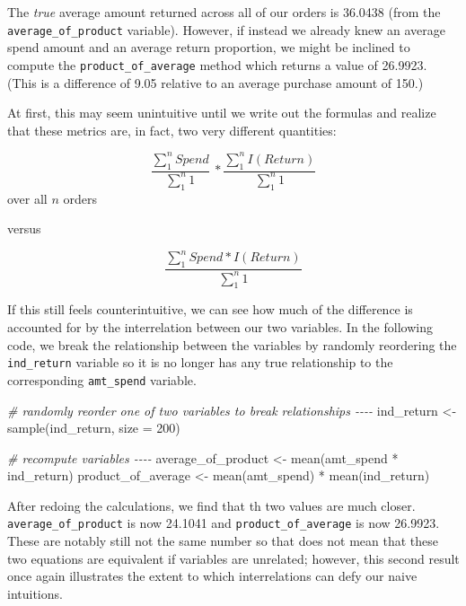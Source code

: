 \documentclass[
]{krantz}
\makeatletter
\newenvironment{Shaded}{\begin{snugshade}}{\end{snugshade}}
\newcommand{\AttributeTok}[1]{\textcolor[rgb]{0.61,0.61,0.61}{#1}}
\newcommand{\CommentTok}[1]{\textcolor[rgb]{0.37,0.37,0.37}{\textit{#1}}}
\newcommand{\DecValTok}[1]{\textcolor[rgb]{0.06,0.06,0.06}{#1}}
\newcommand{\FunctionTok}[1]{\textcolor[rgb]{0,0,0}{#1}}
\newcommand{\NormalTok}[1]{#1}
\newcommand{\OtherTok}[1]{\textcolor[rgb]{0.37,0.37,0.37}{#1}}
\newcommand{\SpecialCharTok}[1]{\textcolor[rgb]{0,0,0}{#1}}
\newenvironment{kframe}{%
\medskip{}
\setlength{\fboxsep}{.8em}
 \def\at@end@of@kframe{}%
 \ifinner\ifhmode%
  \def\at@end@of@kframe{\end{minipage}}%
  \begin{minipage}{\columnwidth}%
 \fi\fi%
 \def\FrameCommand##1{\hskip\@totalleftmargin \hskip-\fboxsep
 \colorbox{shadecolor}{##1}\hskip-\fboxsep
     \hskip-\linewidth \hskip-\@totalleftmargin \hskip\columnwidth}%
 \MakeFramed {\advance\hsize-\width
   \@totalleftmargin\z@ \linewidth\hsize
   \@setminipage}}%
 {\par\unskip\endMakeFramed%
 \at@end@of@kframe}
\renewenvironment{Shaded}{\begin{kframe}}{\end{kframe}}
\makeatother
\begin{document}
The \emph{true} average amount returned across all of our orders is 36.0438 (from the \texttt{average\_of\_product} variable).
However, if instead we already knew an average spend amount and an average return proportion, we might be inclined to compute the \texttt{product\_of\_average} method which returns a value of 26.9923.
(This is a difference of 9.05 relative to an average purchase amount of 150.)

At first, this may seem unintuitive until we write out the formulas and realize that these metrics are, in fact, two very different quantities:

\[ \frac{ \sum_{1}^{n} Spend }{\sum_{1}^{n} 1} \ * \frac{ \sum_{1}^{n} I(Return) }{\sum_{1}^{n} 1} \] over all \(n\) orders

versus

\[ \frac{\sum_{1}^{n} Spend * I(Return)}{\sum_{1}^{n} 1} \]

If this still feels counterintuitive, we can see how much of the difference is accounted for by the interrelation between our two variables.
In the following code, we break the relationship between the variables by randomly reordering the \texttt{ind\_return} variable so it is no longer has any true relationship to the corresponding \texttt{amt\_spend} variable.

\begin{Shaded}
\begin{Highlighting}[]
\CommentTok{\# randomly reorder one of two variables to break relationships {-}{-}{-}{-}}
\NormalTok{ind\_return }\OtherTok{\textless{}{-}} \FunctionTok{sample}\NormalTok{(ind\_return, }\AttributeTok{size =} \DecValTok{200}\NormalTok{)}

\CommentTok{\# recompute variables {-}{-}{-}{-}}
\NormalTok{average\_of\_product }\OtherTok{\textless{}{-}} \FunctionTok{mean}\NormalTok{(amt\_spend }\SpecialCharTok{*}\NormalTok{ ind\_return)}
\NormalTok{product\_of\_average }\OtherTok{\textless{}{-}} \FunctionTok{mean}\NormalTok{(amt\_spend) }\SpecialCharTok{*} \FunctionTok{mean}\NormalTok{(ind\_return)}
\end{Highlighting}
\end{Shaded}

After redoing the calculations, we find that th two values are much closer.
\texttt{average\_of\_product} is now 24.1041 and \texttt{product\_of\_average} is now 26.9923.
These are notably still not the same number so that does not mean that these two equations are equivalent if variables are unrelated;
however, this second result once again illustrates the extent to which interrelations can defy our naive intuitions.
\end{document}
